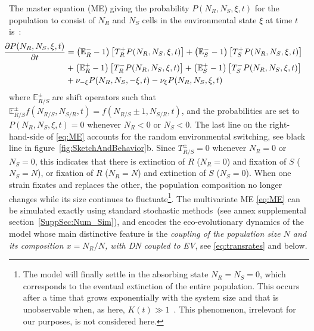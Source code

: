 \documentclass{article}
\begin{document}
The master equation (ME) giving the probability $P(N_R,N_S,\xi,t)$ for the population to consist of $N_R$ and $N_S$ cells in the environmental state $\xi$ at time $t$ is~\cite{Gardiner}:
\begin{align}
\label{eq:ME}
\hspace{-5mm}
\frac{\partial P(N_R,N_S,\xi,t)}{\partial t} &=  \left( \mathbb{E}_R^--1\right)\left[T^+_R P(N_R,N_S,\xi,t)\right]+\left( \mathbb{E}_S^--1\right)\left[T^+_S P(N_R,N_S,\xi,t)\right] \nonumber \\
&+
\left( \mathbb{E}_R^+-1\right)\left[T^-_R P(N_R,N_S,\xi,t)\right]  +\left( \mathbb{E}_S^+-1\right)\left[T^-_S P(N_R,N_S,\xi,t)\right] \\
&+ \nu_{-\xi} P(N_R,N_S,-\xi,t)-\nu_\xi P(N_R,N_S,\xi,t) \nonumber
\end{align}
where \(\mathbb{E}^{\pm}_{R/S}\) are shift operators such that \(\mathbb{E}^{\pm}_{R/S} f(N_{R/S},N_{S/R},t)=f(N_{R/S}\pm 1,N_{S/R},t)\), and the probabilities are set to \(P(N_R,N_S,\xi,t)=0\) whenever \(N_R<0\) or \(N_S<0\). The last line on the right-hand-side of \eqref{eq:ME} accounts for the random environmental switching, see black line in figure~\ref{fig:SketchAndBehavior}b. Since $T^{\pm}_{R/S}=0$ whenever $N_R=0$ or $N_S=0$, this indicates that there is extinction of $R$ (\(N_R=0\)) and fixation of $S$ (\(N_S=N\)), or fixation of $R$ (\(N_R=N\)) and extinction of $S$ (\(N_S=0\)). When one strain fixates and replaces the other, the population composition no longer changes while its size continues to fluctuate\footnote{The model will finally settle in the absorbing state $N_R=N_S=0$, which corresponds to the eventual extinction of the entire population. This occurs after a time that grows exponentially with the system size and that is unobservable when, as here, $K(t)\gg 1$~\cite{Spalding17, wienand2017evolution, wienand2018eco, taitelbaum2020population}. This phenomenon, irrelevant for our purposes, is not considered here.}. The multivariate ME \eqref{eq:ME} can be simulated exactly using standard stochastic methods~(see annex supplemental section~\ref{SuppSec:Num_Sim}), and encodes the eco-evolutionary dynamics of the model whose main distinctive feature is the \emph{coupling of the population size $N$ and its composition  $x=N_R/N$, with DN coupled to EV}, see \eqref{eq:transrates} and below.
\end{document}
